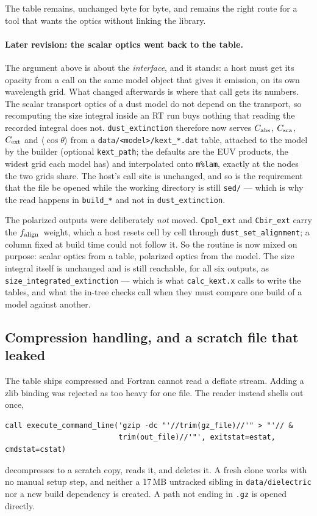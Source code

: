 \documentclass{my_memo}
\newcommand{\code}[1]{\texttt{#1}}
\newcommand{\Cabs}{\ensuremath{C_{\rm abs}}}
\newcommand{\falign}{\ensuremath{f_{\rm align}}}
\begin{document}
The table remains, unchanged byte for byte, and remains the right route for a
tool that wants the optics without linking the library.

\paragraph{Later revision: the scalar optics went back to the table.} The
argument above is about the \emph{interface}, and it stands: a host must get
its opacity from a call on the same model object that gives it emission, on its
own wavelength grid. What changed afterwards is where that call gets its
numbers. The scalar transport optics of a dust model do not depend on the
transport, so recomputing the size integral inside an RT run buys nothing that
reading the recorded integral does not. \code{dust\_extinction} therefore now
serves \Cabs, $C_{\rm sca}$, $C_{\rm ext}$ and $\langle\cos\theta\rangle$ from a
\code{data/<model>/kext\_*.dat} table, attached to the model by the builder (optional
\code{kext\_path}; the defaults are the EUV products, the widest grid each model
has) and interpolated onto \code{m\%lam}, exactly at the nodes the two grids
share. The host's call site is unchanged, and so is the requirement that the
file be opened while the working directory is still \code{sed/} --- which is why
the read happens in \code{build\_*} and not in \code{dust\_extinction}.

The polarized outputs were deliberately \emph{not} moved. \code{Cpol\_ext} and
\code{Cbir\_ext} carry the \falign\ weight, which a host resets cell by cell
through \code{dust\_set\_alignment}; a column fixed at build time could not
follow it. So the routine is now mixed on purpose: scalar optics from a table,
polarized optics from the model. The size integral itself is unchanged and is
still reachable, for all six outputs, as
\code{size\_integrated\_extinction} --- which is what \code{calc\_kext.x} calls
to write the tables, and what the in-tree checks call when they must compare one
build of a model against another.

\subsection{Compression handling, and a scratch file that leaked}

The table ships compressed and Fortran cannot read a deflate stream. Adding a
zlib binding was rejected as too heavy for one file. The reader instead shells
out once,
\begin{lstlisting}
call execute_command_line('gzip -dc "'//trim(gz_file)//'" > "'// &
                          trim(out_file)//'"', exitstat=estat, cmdstat=cstat)
\end{lstlisting}
decompresses to a scratch copy, reads it, and deletes it. A fresh clone works with
no manual setup step, and neither a 17\,MB untracked sibling in
\code{data/dielectric} nor a new build dependency is created. A path not ending in
\code{.gz} is opened directly.
\end{document}
